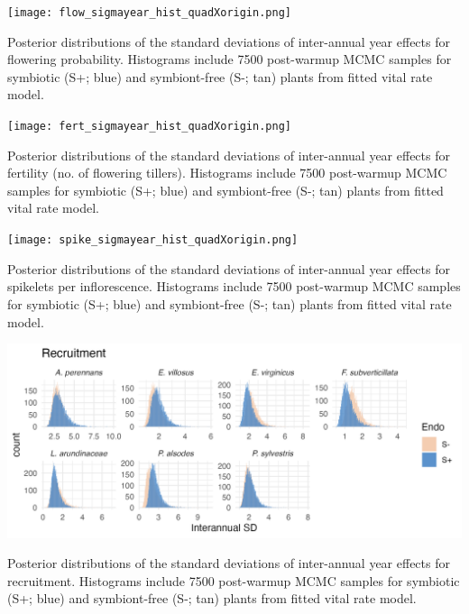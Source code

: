 \documentclass[lineno, sn-basic]{sn-jnl}%
\begin{document}
\begin{myfigure}[H]
	\centering
	\texttt{[image: flow\_sigmayear\_hist\_quadXorigin.png]}
	\caption[Posterior distributions of the standard deviations of inter-annual year effects for flowering probability]{Posterior distributions of the standard deviations of inter-annual year effects for flowering probability. Histograms include 7500 post-warmup MCMC samples for symbiotic (S+; blue) and symbiont-free (S-; tan) plants from fitted vital rate model.}
\end{myfigure}


\begin{myfigure}[H]
	\centering
	\texttt{[image: fert\_sigmayear\_hist\_quadXorigin.png]}
	\caption[Posterior distributions of the standard deviations of inter-annual year effects for fertility]{Posterior distributions of the standard deviations of inter-annual year effects for fertility (no. of flowering tillers). Histograms include 7500 post-warmup MCMC samples for symbiotic (S+; blue) and symbiont-free (S-; tan) plants from fitted vital rate model.}
\end{myfigure}


\begin{myfigure}[H]
	\centering
	\texttt{[image: spike\_sigmayear\_hist\_quadXorigin.png]}
	\caption[Posterior distributions of the standard deviations of inter-annual year effects for spikelets per inflorescence]{Posterior distributions of the standard deviations of inter-annual year effects for spikelets per inflorescence. Histograms include 7500 post-warmup MCMC samples for symbiotic (S+; blue) and symbiont-free (S-; tan) plants from fitted vital rate model.}
\end{myfigure}


\begin{myfigure}[H]
	\centering
	\includegraphics[width=.9\linewidth]{recruit_sigmayear_hist.png}
	\caption[Posterior distributions of the standard deviations of inter-annual year effects for recruitment]{Posterior distributions of the standard deviations of inter-annual year effects for recruitment. Histograms include 7500 post-warmup MCMC samples for symbiotic (S+; blue) and symbiont-free (S-; tan) plants from fitted vital rate model.}
\end{myfigure}
\end{document}
